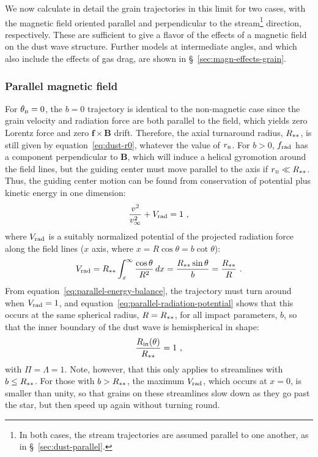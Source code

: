 We now calculate in detail the grain trajectories in this limit for
two cases, with the magnetic field oriented parallel and perpendicular
to the stream\footnote{In both cases, the stream trajectories are
  assumed parallel to one another, as in \S~\ref{sec:dust-parallel}.}
direction, respectively. These are sufficient to give a flavor of the
effects of a magnetic field on the dust wave structure.  Further
models at intermediate angles, and which also include the effects of
gas drag, are shown in \S~\ref{sec:magn-effects-grain}.

\subsubsection{Parallel magnetic field}
\label{sec:parall-magn-field}

For \(\theta_{\scriptscriptstyle\text{B}} = 0\), the \(b = 0\) trajectory is identical to the
non-magnetic case since the grain velocity and radiation force are
both parallel to the field, which yields zero Lorentz force and zero
\(\bm{f} \times \bm{B}\) drift. Therefore, the axial turnaround radius,
\(R_{**}\), is still given by equation~\eqref{eq:dust-r0},
whatever the value of \(r_{\scriptscriptstyle\text{B}}\).  For \(b > 0 \), \(f_{\text{rad}}\) has
a component perpendicular to \(\bm{B}\), which will induce a helical
gyromotion around the field lines, but the guiding center must move
parallel to the axis if \(r_{\scriptscriptstyle\text{B}} \ll R_{**}\).  Thus, the guiding
center motion can be found from conservation of potential plus kinetic
energy in one dimension:
\begin{equation}
  \label{eq:parallel-energy-balance}
  \frac{v^2}{v_\infty^2} + V_{\text{rad}} = 1 \ , 
\end{equation}
where \(V_{\text{rad}}\) is a suitably normalized potential of the projected
radiation force along the field lines (\(x\) axis, where
\(x = R \cos\theta = b \cot\theta\)):
\begin{equation}
  \label{eq:parallel-radiation-potential}
  V_{\text{rad}} = R_{**} \int_x^\infty \frac{\cos\theta}{R^2}\, dx
  = \frac{R_{**}\sin\theta}{b}
  = \frac{R_{**}}{R} \ .
\end{equation}
From equation~\eqref{eq:parallel-energy-balance}, the trajectory must
turn around when \(V_{\text{rad}} = 1\), and
equation~\eqref{eq:parallel-radiation-potential} shows that this
occurs at the same spherical radius, \(R = R_{**}\), for all
impact parameters, \(b\), so that the inner boundary of the dust wave
is hemispherical in shape:
\begin{equation}
  \label{eq:thB-0-shape}
  \frac{R_{\text{in}}(\theta)} {R_{**}} = 1 \ ,
\end{equation}
with \(\Pi = \Lambda = 1\).  Note, however, that this only applies to
streamlines with \(b \le R_{**}\).  For those with
\(b > R_{**}\), the maximum \(V_{\text{rad}}\), which occurs at \(x = 0\),
is smaller than unity, so that grains on these streamlines slow down
as they go past the star, but then speed up again without turning
round.

